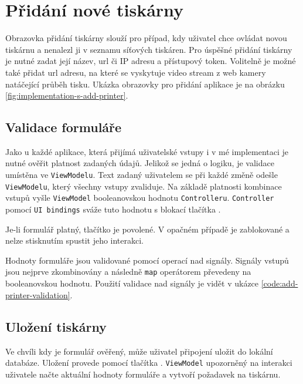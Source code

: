 \section{Přidání nové tiskárny}

Obrazovka přidání tiskárny slouží pro případ, kdy uživatel chce ovládat novou tiskárnu a nenalezl ji v seznamu síťových tiskáren.
Pro úspěšné přidání tiskárny je nutné zadat její název, \acrshort{url} či IP adresu a přístupový token.
Volitelně je možné také přidat url adresu, na které se vyskytuje video stream z web kamery natáčející průběh tisku.
Ukázka obrazovky pro přidání aplikace je na obrázku \ref{fig:implementation-s-add-printer}.


\subsection{Validace formuláře}

Jako u každé aplikace, která přijímá uživatelské vstupy i v mé implementaci je nutné ověřit platnost zadaných údajů.
Jelikož se jedná o logiku, je validace umístěna ve \texttt{ViewModelu}.
Text zadaný uživatelem se při každé změně odešle \texttt{ViewModelu}, který všechny vstupy zvaliduje.
Na základě platnosti kombinace vstupů vyšle \texttt{ViewModel} booleanovskou hodnotu \texttt{Controlleru}.
\texttt{Controller} pomocí \texttt{UI bindings} sváže tuto hodnotu s blokací tlačítka . 

Je-li formulář platný, tlačítko je povolené.
V opačném případě je zablokované a nelze stisknutím spustit jeho interakci.

Hodnoty formuláře jsou validované pomocí operací nad signály.
Signály vstupů jsou nejprve zkombinovány a následně \texttt{map} operátorem převedeny na booleanovskou hodnotu.
Použití validace nad signály je vidět v ukázce \ref{code:add-printer-validation}.


\subsection{Uložení tiskárny}

Ve chvíli kdy je formulář ověřený, může uživatel připojení uložit do lokální databáze.
Uložení provede pomocí tlačítka .
\texttt{ViewModel} upozorněný na interakci uživatele načte aktuální hodnoty formuláře a vytvoří požadavek na tiskárnu.

